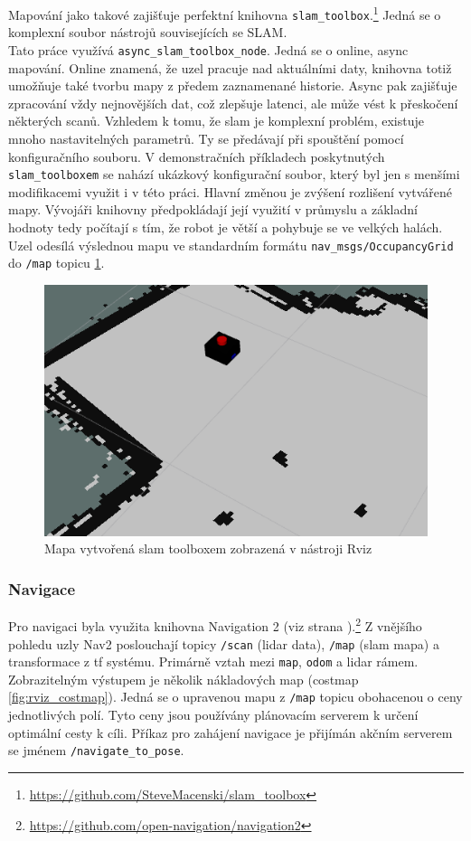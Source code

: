 Mapování jako takové zajišťuje perfektní knihovna \verb|slam_toolbox|.\footnote{\url{https://github.com/SteveMacenski/slam_toolbox}} Jedná se o komplexní soubor nástrojů souvisejících se SLAM. \\ Tato práce využívá \verb|async_slam_toolbox_node|. Jedná se o online, async mapování. Online znamená, že uzel pracuje nad aktuálními daty, knihovna totiž umožňuje také tvorbu mapy z předem zaznamenané historie. Async pak zajišťuje zpracování vždy nejnovějších dat, což zlepšuje latenci, ale může vést k přeskočení některých scanů. Vzhledem k tomu, že slam je komplexní problém, existuje mnoho nastavitelných parametrů. Ty se předávají při spouštění pomocí konfiguračního souboru. V demonstračních příkladech poskytnutých \verb|slam_toolboxem| se nahází ukázkový konfigurační soubor, který byl jen s menšími modifikacemi využit i v této práci. Hlavní změnou je zvýšení rozlišení vytvářené mapy. Vývojáři knihovny předpokládají její využití v průmyslu a základní hodnoty tedy počítají s tím, že robot je větší a pohybuje se ve velkých halách. Uzel odesílá výslednou mapu ve standardním formátu \verb|nav_msgs/OccupancyGrid| do \verb|/map| topicu \ref{fig:rviz_slam_map}.

\begin{figure}[h!]
	\centering
	\includegraphics[scale=0.7]{obrazky-figures/slam.png}
	\caption{Mapa vytvořená slam toolboxem zobrazená v nástroji Rviz}
	\label{fig:rviz_slam_map}
\end{figure}

\subsubsection*{Navigace}
Pro navigaci byla využita knihovna Navigation 2 (viz strana \pageref{theory:nav2}).\footnote{\url{https://github.com/open-navigation/navigation2}} 
Z vnějšího pohledu uzly Nav2 poslouchají topicy \verb|/scan| (lidar data), \verb|/map| (slam mapa) a transformace z tf systému. Primárně vztah mezi \verb|map|, \verb|odom| a lidar rámem. Zobrazitelným výstupem je několik nákladových map (costmap \ref{fig:rviz_costmap}). Jedná se o upravenou mapu z \verb|/map| topicu obohacenou o ceny jednotlivých polí. Tyto ceny jsou používány plánovacím serverem k určení optimální cesty k cíli. Příkaz pro zahájení navigace je přijímán akčním serverem se jménem \verb|/navigate_to_pose|. 

